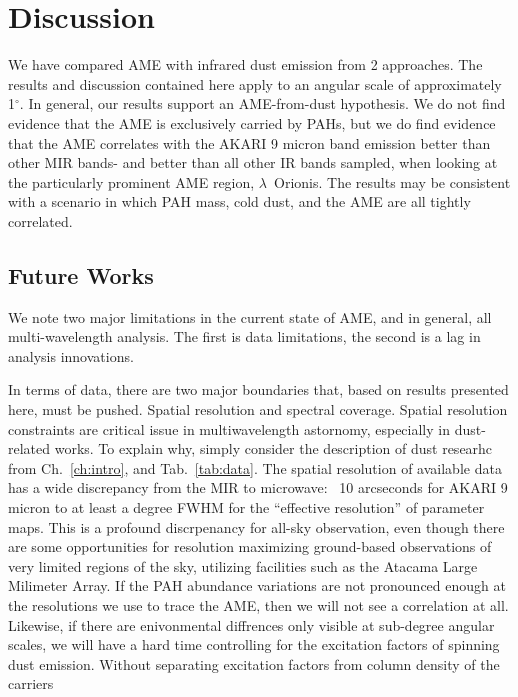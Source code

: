 \chapter{Discussion}
  \label{ch:discussion}

    We have compared AME with infrared dust emission from 2 approaches. The results and discussion contained here apply to an angular scale of approximately 1$^{\circ}$. In general, our results support an AME-from-dust hypothesis. We do not find evidence that the AME is exclusively carried by PAHs, but we do find evidence that the AME correlates with the AKARI 9 micron band emission better than other MIR bands- and better than all other IR bands sampled, when looking at the particularly prominent AME region, $\lambda$~Orionis. The results may be consistent with a scenario in which PAH mass, cold dust, and the AME are all tightly correlated.

\section{Future Works}
    We note two major limitations in the current state of AME, and in general, all multi-wavelength analysis.
    The first is data limitations, the second is a lag in analysis innovations.

    In terms of data, there are two major boundaries that, based on results presented here, must be pushed. Spatial resolution and spectral coverage.
    Spatial resolution constraints are critical issue in multiwavelength astornomy, especially in dust-related works. To explain why, simply consider the description of dust researhc from Ch.~\ref{ch:intro}, and Tab.~\ref{tab:data}. The spatial resolution of available data has a wide discrepancy from the MIR to microwave: ~10 arcseconds for AKARI 9 micron to at least a degree FWHM for the ``effective resolution'' of parameter maps. This is a profound discrpenancy for all-sky observation, even though there are some opportunities for resolution maximizing ground-based observations of very limited regions of the sky, utilizing facilities such as the Atacama Large Milimeter Array. If the PAH abundance variations are not pronounced enough at the resolutions we use to trace the AME, then we will not see a correlation at all. Likewise, if there are enivonmental diffrences only visible at sub-degree angular scales, we will have a hard time controlling for the excitation factors of spinning dust emission. Without separating excitation factors from column density of the carriers
